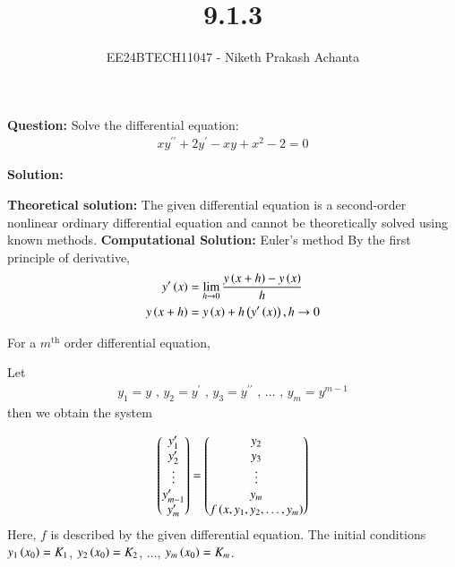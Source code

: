 \documentclass[journal]{IEEEtran}
\begin{document}

\vspace{3cm}

\title{9.1.3}
\author{EE24BTECH11047 - Niketh Prakash Achanta}
{\let\newpage\relax\maketitle}

\renewcommand{\thefigure}{\theenumi}
\renewcommand{\thetable}{\theenumi}
\setlength{\intextsep}{10pt} %

\textbf{Question:}
\newline
Solve the differential equation:
\begin{align}
	x y^{\prime\prime} + 2y^{\prime} - x y + x^2 - 2 = 0
\end{align}

\textbf{Solution:}

\textbf{Theoretical solution:}
\newline
The given differential equation is a second-order nonlinear ordinary differential equation and cannot be theoretically solved using known methods.
\newline
\textbf{Computational Solution:} Euler's method
\newline
By the first principle of derivative,
\begin{align}
    y^{\prime}\left(x\right) &= \lim_{h\to0} \frac{y\left(x + h\right) - y\left(x\right)}{h}\\
    y\left(x + h\right) &= y\left(x\right) + h\left(y^{\prime}\left(x\right)\right), h\to0
\end{align}

For a $m^{\text{th}}$ order differential equation,
\newline

Let 
\begin{align}
    y_1 = y \text{ , } y_2 = y^{\prime} \text{ , } y_3 = y^{\prime\prime} \text{ , } \dots \text{ , } y_m = y^{m - 1}
\end{align}
then we obtain the system

\begin{align}
    \begin{pmatrix}y_1^{\prime}\\y_2^{\prime}\\\vdots\\y_{m - 1}^{\prime}\\y_m^{\prime}\end{pmatrix} = \begin{pmatrix}y_2\\y_3\\\vdots\\y_m\\f\left(x, y_1, y_2,\dots,y_m\right)\end{pmatrix}
\end{align}
Here, $f$ is described by the given differential equation. The initial conditions $y_1\left(x_0\right) = K_1$, $y_2\left(x_0\right) = K_2$, $\dots$, $y_m\left(x_0\right) = K_m$.
\end{document}

